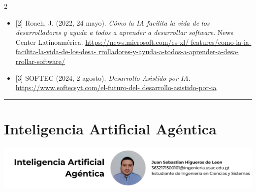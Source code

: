 \documentclass[12pt,spanish,Letterpaper,openany]{book}
\newcommand{\HRule}{\begin{center}\rule{0.5\linewidth}{0.2mm}\end{center}}
\begin{document}
\begin {multicols}{2}
\begin{itemize}
\item
  {[}2{]} Roach, J. (2022, 24 mayo). \emph{Cómo la IA facilita la vida de los desarrolladores y ayuda a todos a aprender a desarrollar software}. News Center Latinoamérica. \href{https://news.microsoft.com/es-xl/features/como-la-ia-facilita-la-vida-de-los-desarrolladores-y-ayuda-a-todos-a-aprender-a-desarrollar-software/}{https://news.microsoft.com/es-xl/
  features/como-la-ia-facilita-la-vida-de-los-desa-
  rrolladores-y-ayuda-a-todos-a-aprender-a-desa-
  rrollar-software/}
\item
  {[}3{]} SOFTEC (2024, 2 agosto). \emph{Desarrollo Asistido por IA}. \href{https://www.softecsyt.com/el-futuro-del-desarrollo-asistido-por-ia}{https://www.softecsyt.com/el-futuro-del-
  desarrollo-asistido-por-ia}
\end{itemize}

\end {multicols}

\medskip

\HRule

\medskip

\hypertarget{art08}{%
\chapter{Inteligencia Artificial Agéntica}\label{art08}}

\begin{center}\includegraphics[width=1\linewidth]{autores/art08} \end{center}
\end{document}
